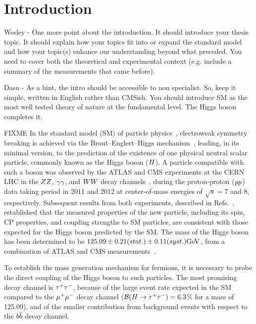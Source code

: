 \chapter{Introduction}

Wesley -
One more point about the introduction. It should introduce your thesis topic.
It should explain how your topics fit into or expand the standard model and
how your topic(s) enhance our understanding beyond what preceded. You
need to cover both the theoretical and experimental context (e.g. include
a summary of the measurements that came before).

Dasu - 
As a hint, the intro should be accessible to non specialist. So, keep it simple, written in English rather than CMSish. You should introduce SM as the most well tested theory of nature at the fundamental level. The Higgs boson completes it.


FIXME
In the standard model (SM) of particle physics~\cite{Glashow:1961tr,SM1,SM3},
electroweak symmetry breaking is achieved via the Brout--Englert--Higgs
mechanism~\cite{Englert:1964et,Higgs:1964ia,Higgs:1964pj,Guralnik:1964eu,Higgs:1966ev,Kibble:1967sv},
leading, in its minimal version, to the prediction of the existence of one physical neutral scalar particle,
commonly known as the Higgs boson ($H$).
A particle compatible with such a boson was observed by the ATLAS and CMS experiments at the CERN LHC
in the $ZZ$, $\gamma \gamma$, and $WW$ decay channels~\cite{Aad:2012tfa, Chatrchyan:2012xdj, Chatrchyan:2013lba},
during the proton-proton ($pp$) data taking period in 2011 and 2012
at center-of-mass energies of $\sqrt{s} = 7$ and 8\TeV, respectively.
Subsequent results from both experiments, described in
Refs.~\cite{Aad:2015gba, Khachatryan:2014jba, Chatrchyan:2012jja, Aad:2013xqa, Khachatryan:2014kca,Sirunyan:2017exp},
established that the measured properties of the new particle,
including its spin, CP properties,
and coupling strengths to SM particles, are consistent with those expected for the Higgs boson predicted by the SM.
The mass of the Higgs boson has been determined to be
$125.09\pm0.21(stat.)\pm0.11(syst.)\mathrm{GeV}$, from a combination of
ATLAS and CMS measurements~\cite{Aad:2015zhl}.

To establish the mass generation mechanism for fermions,
 it is necessary to probe the direct coupling of
the Higgs boson to such particles.
The most promising decay channel is $\tau^+\tau^-$,
because of the large event rate expected in the SM compared to the $\mu^+\mu^-$ decay channel ($\mathcal{B}(H\to\tau^+\tau^-)=6.3$\% for a mass of 125.09\GeV), and of the smaller contribution from background events
with respect to the $b\bar{b}$ decay channel.

